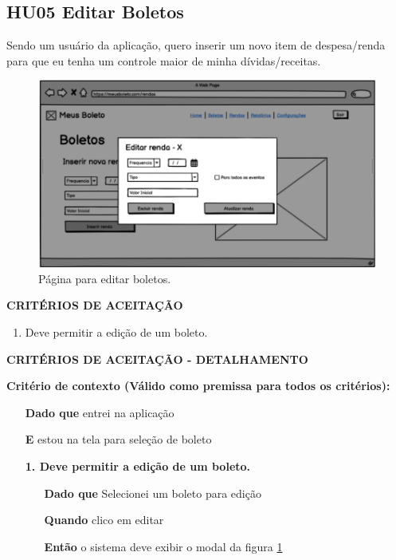 \subsection{HU05 Editar Boletos}

Sendo um usuário da aplicação, quero inserir um novo item de despesa/renda para que eu tenha um controle maior de minha dívidas/receitas.

\begin{figure}[htb]
	\caption{\label{fig:hu05}Página para editar boletos.}
	\begin{center}
		\includegraphics[scale=0.5]{images/EditarBoletoRenda.png}
	\end{center}
\end{figure}


\textbf{CRITÉRIOS DE ACEITAÇÃO}

\begin{enumerate}
    \item Deve permitir a edição de um boleto.
\end{enumerate}

\textbf{CRITÉRIOS DE ACEITAÇÃO - DETALHAMENTO}

\textbf{Critério de contexto (Válido como premissa para todos os critérios):}

\begin{itemize}
    \item[\textbf{Dado que}] entrei na aplicação
    \item[\textbf{E}] estou na tela para seleção de boleto
\end{itemize}


\begin{itemize}
    \item[] \textbf{1. Deve permitir a edição de um boleto.}

    \begin{itemize}
        \item[\textbf{Dado que}] Selecionei um boleto para edição
        \item[\textbf{Quando}] clico em editar
        \item[\textbf{Então}] o sistema deve exibir o modal da figura \ref{fig:hu05} 
    \end{itemize}
\end{itemize}

